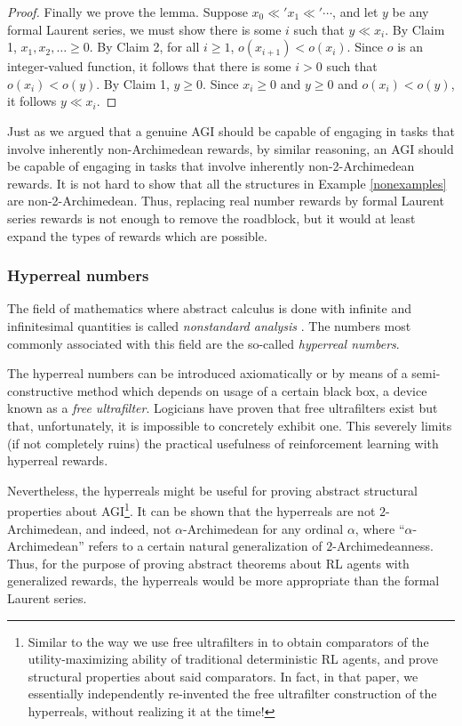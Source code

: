 \documentclass[reqno]{article}
\theoremstyle{definition}
\begin{document}
\begin{proof}
Finally we prove the lemma. Suppose $x_0\ll' x_1\ll' \cdots$, and let
$y$ be any formal Laurent series, we must show there is some $i$ such that
$y\ll x_i$. By Claim 1, $x_1,x_2,\ldots\geq 0$.
By Claim 2, for all $i\geq 1$, $o(x_{i+1})<o(x_i)$.
Since $o$ is an integer-valued function, it follows that there is some $i>0$
such that $o(x_i)<o(y)$. By Claim 1, $y\geq 0$. Since $x_i\geq 0$ and $y\geq 0$
and $o(x_i)<o(y)$, it follows $y\ll x_i$.
\end{proof}

Just as we argued that a genuine AGI should be capable of engaging in tasks that
involve inherently non-Archimedean rewards, by similar reasoning, an AGI should
be capable of engaging in tasks that involve inherently non-2-Archimedean rewards.
It is not hard to show that all the structures in Example \ref{nonexamples} are
non-2-Archimedean. Thus, replacing real number rewards by formal Laurent series
rewards is not enough to remove the roadblock, but it would at least expand the
types of rewards which are possible.


\subsubsection{Hyperreal numbers}

The field of mathematics where abstract calculus is done with infinite and infinitesimal
quantities is called \emph{nonstandard analysis} \cite{robinson}. The numbers most
commonly associated with this field are the so-called \emph{hyperreal numbers}.

The hyperreal numbers can be
introduced axiomatically or by means of a semi-constructive method which depends on
usage of a certain black box, a device known as a \emph{free ultrafilter}. Logicians
have proven that free ultrafilters exist but that, unfortunately, it is impossible to
concretely exhibit one. This severely limits (if not completely ruins) the practical
usefulness of reinforcement learning with hyperreal rewards.

Nevertheless, the hyperreals
might be useful for proving abstract structural properties about AGI\footnote{Similar to
the way we use free ultrafilters in \cite{alexander2019intelligence} to obtain
comparators of the utility-maximizing ability of traditional deterministic RL agents,
and prove structural properties about said comparators.
In fact, in that paper, we essentially independently re-invented the free ultrafilter
construction of the hyperreals, without realizing it at the time!}.
It can be shown that the hyperreals are not $2$-Archimedean, and indeed, not
$\alpha$-Archimedean for any ordinal $\alpha$, where ``$\alpha$-Archimedean'' refers to a
certain natural generalization of $2$-Archimedeanness. Thus, for the purpose of
proving abstract theorems about RL agents with generalized rewards, the hyperreals
would be more appropriate than the formal Laurent series.
\end{document}
